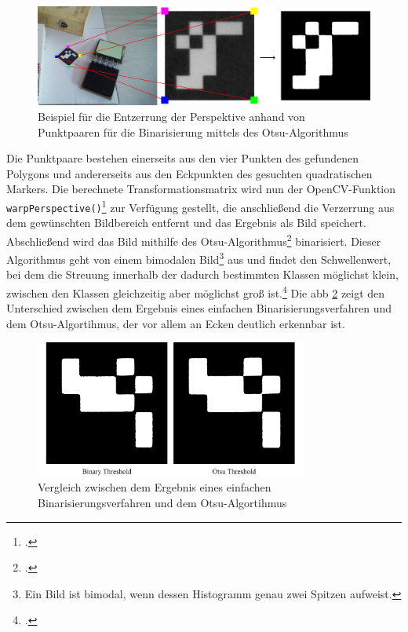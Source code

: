\begin{figure}[H]
\centering
\includegraphics[width=15cm]{Bilder/Implementierung/warping.png}
\caption{Beispiel für die Entzerrung der Perspektive anhand von Punktpaaren für die Binarisierung mittels des Otsu-Algorithmus}
\label{fig:Warping}
\end{figure}

\noindent Die Punktpaare bestehen einerseits aus den vier Punkten des gefundenen Polygons und andererseits aus den Eckpunkten des gesuchten quadratischen Markers. Die berechnete Transformationsmatrix wird nun der OpenCV-Funktion \texttt{warpPerspective()}\footcite{opencvwarpPerspective} zur Verfügung gestellt, die anschließend die Verzerrung aus dem gewünschten Bildbereich entfernt und das Ergebnis als Bild speichert. Abschließend wird das Bild mithilfe des Otsu-Algorithmus\footcite{AdaptiveThresholdingDescription} binarisiert. Dieser Algorithmus geht von einem bimodalen Bild\footnote{Ein Bild ist bimodal, wenn dessen Histogramm genau zwei Spitzen aufweist.} aus und findet den Schwellenwert, bei dem die Streuung innerhalb der dadurch bestimmten Klassen möglichst klein, zwischen den Klassen gleichzeitig aber möglichst groß ist.\footcite{Otsu1979} Die \acs{abb} \ref{fig:comparisonOtsubinary} zeigt den Unterschied zwischen dem Ergebnis eines einfachen Binarisierungsverfahren und dem Otsu-Algortihmus, der vor allem an Ecken deutlich erkennbar ist.

\begin{figure}[H]
\centering
\includegraphics[width=9cm]{Bilder/Implementierung/threshold_binary_otsu.png}
\caption{Vergleich zwischen dem Ergebnis eines einfachen Binarisierungsverfahren und dem Otsu-Algortihmus}
\label{fig:comparisonOtsubinary}
\end{figure}

